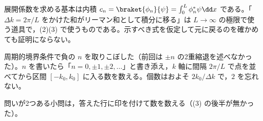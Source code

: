 \item 展開係数を求める基本は内積 $c_{n}=\braket{\phi_{n}}{\psi}=\int_{0}^{L}\phi_{n}^{*}\psi\dd x$ である。「$\Delta k=2\pi/L$ をかけた和がリーマン和として積分に移る」は $L\to\infty$ の極限で使う道具で，(2)(3) で使うものである。示すべき式を仮定して元に戻るのを確かめても証明にならない。
\item {} 周期的境界条件で負の $n$ を取りこぼした（前回は $\pm n$ の2重縮退を述べなかった）。$n$ を書いたら「$n=0,\pm1,\pm2,\ldots$」と書き添え，$k$ 軸に間隔 $2\pi/L$ で点を並べてから区間 $[-k_{0},k_{0}]$ に入る数を数える。個数はおよそ $2k_{0}/\Delta k$ で，$2$ を忘れない。
\item 問いが2つある小問は，答えた行に印を付けて数を数える（(3) の後半が無かった）。
